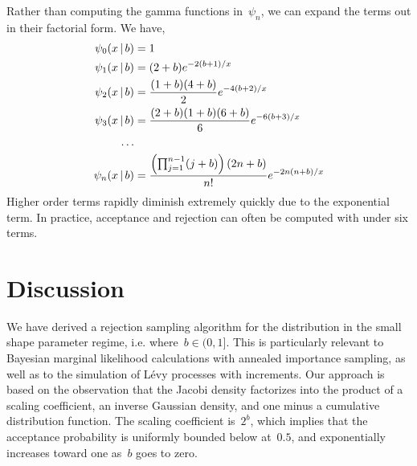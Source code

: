 \documentclass[aos,preprint]{imsart}
\begin{document}
Rather than computing the gamma functions in~$\psi_n$, we can expand the terms out 
in their factorial form. We have,
\begin{align}
\psi_0(x \given b) &= 1 \\
\psi_1(x \given b) &= (2+b) e^{-2(b+1) / x} \\
\psi_2(x \given b) &= \frac{(1+b)(4+b)}{2} e^{-4(b+2) / x} \\
\psi_3(x \given b) &= \frac{(2+b)(1+b)(6+b)}{6} e^{-6(b+3) / x} \\
\nonumber \ldots & \\
\psi_n(x \given b) &= \frac{\left(\prod_{j=1}^{n-1} (j+b) \right) (2n+b)}{n!} e^{-2n(n+b)/x} 
\end{align}
Higher order terms rapidly diminish extremely quickly due to the
exponential term. In practice, acceptance and rejection can often 
be computed with under six terms.

\section{Discussion}
We have derived a rejection sampling algorithm for the \polyagamma distribution 
in the small shape parameter regime, i.e. where~$b \in (0,1]$. This is 
particularly relevant to Bayesian marginal likelihood calculations with 
annealed importance sampling, as well as to the simulation of L\'{e}vy 
processes with \polyagamma increments. Our approach is based on the observation 
that the Jacobi density factorizes into the product of a scaling coefficient, 
an inverse Gaussian density, and one minus a cumulative distribution function.
The scaling coefficient is~$2^b$, which implies that the acceptance probability 
is uniformly bounded below at~$0.5$, and exponentially increases toward one 
as~$b$ goes to zero. 



\end{document}
